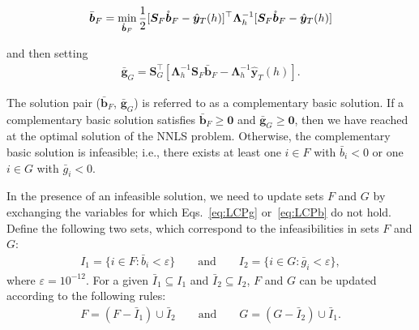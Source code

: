 \documentclass[twocolumn]{svjour3}
\begin{document}
\begin{align}
\label{eq:basicquad}
\bar{\bm{b}}_{F} = \operatornamewithlimits{min}_{\mathring{\bm{b}}_{F}} \frac{1}{2}[\bm{S}_{F}\mathring{\bm{b}}_{F} - \hat{\bm{y}}_{T}(h)]^\top\bm{\Lambda}_{h}^{-1} [\bm{S}_{F}\mathring{\bm{b}}_{F} - \hat{\bm{y}}_{T}(h)]
\end{align}

and then setting
\begin{align}
\label{eq:basicgrad}
\bar{\bm{g}}_{G} = \bm{S}_{G}^\top[\bm{\Lambda}_{h}^{-1}\bm{S}_{F}\bar{\bm{b}}_{F} - \bm{\Lambda}_{h}^{-1}\hat{\bm{y}}_{T}(h)].
\end{align}

The solution pair ($\bar{\bm{b}}_{F}$, $\bar{\bm{g}}_{G}$) is referred to as a complementary basic solution. If a complementary basic solution satisfies $\bar{\bm{b}}_{F} \geq \bm{0}$ and $\bar{\bm{g}}_{G} \geq \bm{0}$, then we have reached at the optimal solution of the NNLS problem. Otherwise, the complementary basic solution is infeasible; i.e., there exists at least one $i \in F$ with $\bar{b}_{i} < 0$ or one $i \in G$ with $\bar{g}_{i} < 0$.

In the presence of an infeasible solution, we need to update sets $F$ and $G$ by exchanging the variables for which Eqs.~\eqref{eq:LCPg} or~\eqref{eq:LCPb} do not hold. Define the following two sets, which correspond to the infeasibilities in sets $F$ and $G$:
\begin{align}
\label{eq:indexset}
I_{1} = \{i \in F: \bar{b}_{i} < \varepsilon\} \qquad \text{and} \qquad I_{2} = \{i \in G: \bar{g}_{i} < \varepsilon\},
\end{align}
where $\varepsilon = 10^{-12}$. For a given $\bar{I}_{1} \subseteq I_{1}$ and $\bar{I}_{2} \subseteq I_{2}$, $F$ and $G$ can be updated according to the following rules:
\begin{align}
\label{eq:indexsetrev}
F = (F - \bar{I}_{1}) \cup \bar{I}_{2} \qquad \text{and} \qquad G = (G - \bar{I}_{2}) \cup \bar{I}_{1}.
\end{align}
\end{document}
